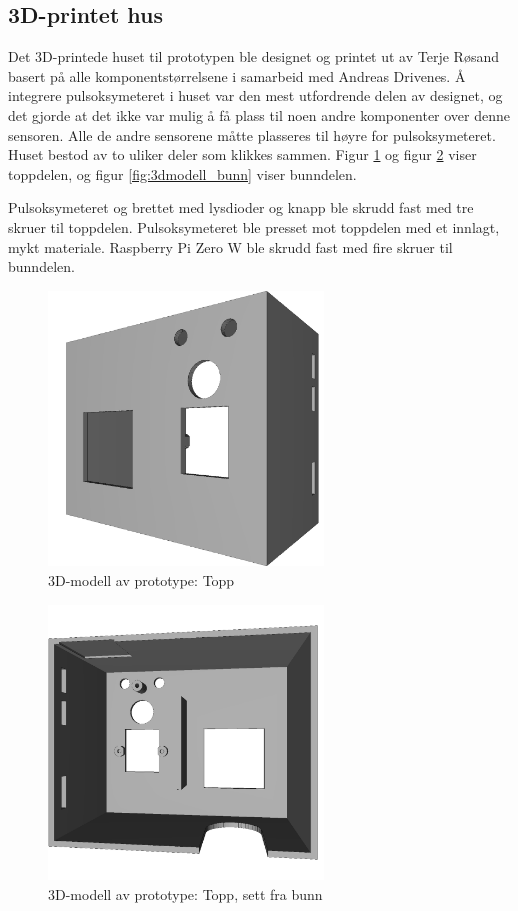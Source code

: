 \subsection{3D-printet hus}
Det 3D-printede huset til prototypen ble designet og printet ut av Terje Røsand basert på alle komponentstørrelsene i samarbeid
med Andreas Drivenes. Å integrere pulsoksymeteret i huset var den mest utfordrende delen av designet, og det gjorde at det ikke var
mulig å få plass til noen andre komponenter over denne sensoren. Alle de andre sensorene måtte plasseres til høyre for pulsoksymeteret.
Huset bestod av to uliker deler som klikkes sammen. Figur \ref{fig:3dmodell_topp1}
og figur \ref{fig:3dmodell_topp2} viser toppdelen, og figur \ref{fig:3dmodell_bunn} viser bunndelen.

Pulsoksymeteret og brettet med lysdioder og knapp ble skrudd fast med tre skruer til toppdelen. Pulsoksymeteret ble presset mot toppdelen
med et innlagt, mykt materiale. Raspberry Pi Zero W ble skrudd fast med fire skruer til bunndelen.

\begin{figure}
\includegraphics[width=0.65\textwidth, center]{fig/prototype/hoved_fra_topp}
\caption{3D-modell av prototype: Topp}
\label{fig:3dmodell_topp1}
\end{figure}
\begin{figure}

\includegraphics[width=0.65\textwidth, center]{fig/prototype/hoved_frabunn}
\caption{3D-modell av prototype: Topp, sett fra bunn}
\label{fig:3dmodell_topp2}
\end{figure}

